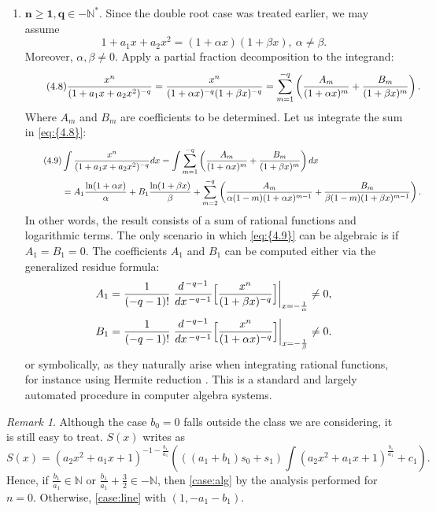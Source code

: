 \documentclass[11pt]{article}
\theoremstyle{definition}
\theoremstyle{plain}
\theoremstyle{remark}
\newtheorem{rem}[defi]{Remark}
\begin{document}
\begin{enumerate}
\item $\mathbf{n\ge1, q\in -\mathbb{N}^*}$.
Since the double root case was treated earlier, we may assume 
\[1+a_1x+a_2x^2 = (1+\alpha x)(1+\beta x), \ \alpha \neq \beta.\] Moreover, $\alpha, \beta \neq 0$. Apply a partial fraction decomposition to the integrand:
\begin{equation}\label{eq:{4.8}} \tag{4.8}
\frac{x^n}{(1+a_1x+a_2x^2)^{-q}} = \frac{x^n}{(1+\alpha x)^{-q} (1+\beta x)^{-q}} = \sum\limits_{m = 1}^{-q} \left(\frac{A_m}{(1+\alpha x)^m} + \frac{B_m}{(1+\beta x)^m} \right).
\end{equation}
Where $A_m$ and $B_m$ are coefficients to be determined. Let us integrate the sum in \eqref{eq:{4.8}}:
\begin{align*} \label{eq:{4.9}} \tag{4.9}
&\int{\frac{x^n}{(1+a_1x+a_2x^2)^{-q}} dx} = \int{\sum\limits_{m = 1}^{-q} \left(\frac{A_m}{(1+\alpha x)^m} + \frac{B_m}{(1+\beta x)^m}\right) dx} \\&= A_1 \frac{\ln(1+\alpha x)}{\alpha} + B_1 \frac{\ln(1+\beta x)}{\beta} + \sum\limits_{m = 2}^{-q} \left(\frac{A_m}{\alpha(1-m)(1+\alpha x)^{m-1}} + \frac{B_m}{\beta(1-m)(1+\beta x)^{m-1}}\right).
\end{align*}
In other words, the result consists of a sum of rational functions and logarithmic terms. The only scenario in which \eqref{eq:{4.9}} can be algebraic is if $A_1 = B_1 = 0$. The coefficients $A_1$ and $B_1$ can be computed either via the generalized residue formula:
\[
A_1 = \frac{1}{(-q-1)!}
  \left.\frac{d^{\,-q-1}}{dx^{\,-q-1}}
    \Bigl[\frac{x^n}{(1+\beta x)^{-q}}\Bigr]
  \right|_{x=-\frac{1}{\alpha}} \neq 0,\]
\[
B_1 = \frac{1}{(-q-1)!}
  \left.\frac{d^{\,-q-1}}{dx^{\,-q-1}}
    \Bigl[\frac{x^n}{(1+\alpha x)^{-q}}\Bigr]
  \right|_{x=-\frac{1}{\beta}}
\neq 0.\]
or symbolically, as they naturally arise when integrating rational functions, for instance using Hermite reduction \cite[Chapter 22]{gerhard2013modern}. This is a standard and largely automated procedure in computer algebra systems.
\end{enumerate}

\begin{rem}
Although the case $b_0=0$ falls outside the class we are considering, it is still easy to treat. $S(x)$ writes as
\[S(x) = (a_2x^2 + a_1x + 1)^{-1 - \frac{b_1}{a_1}}\left(((a_1+b_1)s_0+s_1)\int(a_2x^2 + a_1x + 1)^{\frac{b_1}{a_1}} + c_1\right).\]
Hence, if $\frac{b_1}{a_1} \in \mathbb{N}$ or $\frac{b_1}{a_1}+\frac{3}{2} \in -\mathbb{N}$, then \cref{case:alg} by the analysis performed for $n=0$.
Otherwise, \cref{case:line} with $(1,-a_1-b_1)$.
\end{rem}
\end{document}

